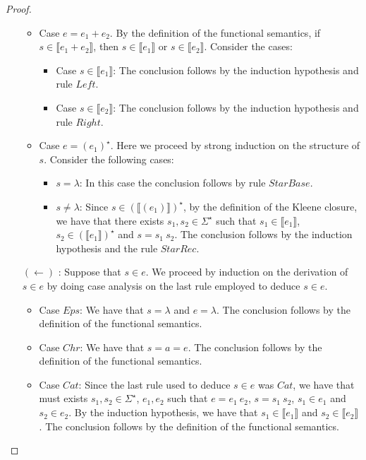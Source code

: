 \documentclass[oneside,12pt]{scrbook}
\theoremstyle{definition}
\newcommand{\sembrackets}[1]{\ensuremath{\llbracket #1 \rrbracket}}
\theoremstyle{plain}
\theoremstyle{definition}
\begin{document}
\begin{proof}
\begin{itemize}
\begin{itemize}
      \item Case $e = e_1 + e_2$. By the definition of the functional semantics, if $s \in \sembrackets{e_1 + e_2}$, then
            $s \in\sembrackets{e_1}$ or $s\in\sembrackets{e_2}$. Consider the cases:
            \begin{itemize}
              \item Case $s \in\sembrackets{e_1}$: The conclusion follows by the induction hypothesis and rule $Left$.
              \item Case $s \in\sembrackets{e_2}$: The conclusion follows by the induction hypothesis and rule $Right$.
            \end{itemize}
      \item Case $e = (e_1)^\star$. Here we proceed by strong induction on the structure of $s$. Consider the following cases:
            \begin{itemize}
              \item $s = \lambda$: In this case the conclusion follows by rule $StarBase$.
              \item $s \neq \lambda$: Since $s \in(\sembrackets{(e_1)})^\star$, by the definition of
                    the Kleene closure, we have that there exists $s_1, s_2 \in \Sigma^\star$ such that $s_1 \in\sembrackets{e_1}$,
                    $s_2 \in(\sembrackets{e_1})^\star$ and $s = s_1\:s_2$. The conclusion follows by the induction hypothesis and the rule $StarRec$.
            \end{itemize}
    \end{itemize}
    \item[$(\leftarrow)$]: Suppose that $s \in e$. We proceed by induction on the derivation of $s \in e$ by doing case analysis on the last
      rule employed to deduce $s \in e$.
    \begin{itemize}
      \item Case $Eps$: We have that $s = \lambda$ and $e = \lambda$. The conclusion follows by the definition of the functional semantics.
      \item Case $Chr$: We have that $s = a = e$. The conclusion follows by the definition of the functional semantics.
      \item Case $Cat$: Since the last rule used to deduce $s \in e$ was $Cat$, we have that must exists $s_1, s_2\in\Sigma^\star$, $e_1, e_2$ such that
            $e = e_1\:e_2$, $s = s_1\:s_2$, $s_1 \in e_1$ and $s_2 \in e_2$. By the induction hypothesis, we have that $s_1 \in\sembrackets{e_1}$ and
            $s_2 \in \sembrackets{e_2}$. The conclusion follows by the definition of the functional semantics.

\end{itemize}
\end{itemize}
\end{proof}
\end{document}
